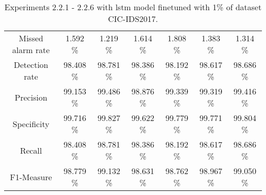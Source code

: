 \begin{table}[htb]
\begin{tabular}{@{}ccccccc@{}}
        Missed alarm rate &  1.592 \% &  1.219 \% &  1.614 \% &  1.808 \% &  1.383 \% &  1.314 \% \\
        Detection rate &  98.408 \% &  98.781 \% &  98.386 \% &  98.192 \% &  98.617 \% &  98.686 \% \\
        Precision &  99.153 \% &  99.486 \% &  98.876 \% &  99.339 \% &  99.319 \% &  99.416 \% \\
        Specificity &  99.716 \% &  99.827 \% &  99.622 \% &  99.779 \% &  99.771 \% &  99.804 \% \\
        Recall &  98.408 \% &  98.781 \% &  98.386 \% &  98.192 \% &  98.617 \% &  98.686 \% \\
        F1-Measure &  98.779 \% &  99.132 \% &  98.631 \% &  98.762 \% &  98.967 \% &  99.050 \% \\
        \bottomrule
    \end{tabular}
    \caption{Experiments 2.2.1 - 2.2.6 with \gls{lstm} model finetuned with 1\% of dataset CIC-IDS2017.}
    \label{table:results:lstm:flows_1}
\end{table}